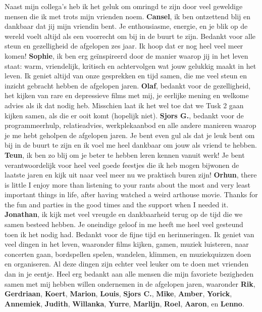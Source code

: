 Naast mijn collega's heb ik het geluk om omringd te zijn door veel geweldige mensen die ik met trots mijn vrienden noem. \newline
\textbf{Cansel}, ik ben ontzettend blij en dankbaar dat jij mijn vriendin bent. Je enthousiasme, energie, en je blik op de wereld voelt altijd als een voorrecht om bij in de buurt te zijn. Bedankt voor alle steun en gezelligheid de afgelopen zes jaar. Ik hoop dat er nog heel veel meer komen! \newline 
\textbf{Sophie}, ik ben erg ge\"{i}nspireerd door de manier waarop jij in het leven staat: warm, vriendelijk, kritisch en achtervolgen wat jouw gelukkig maakt in het leven. Ik geniet altijd van onze gesprekken en tijd samen, die me veel steun en inzicht gebracht hebben de afgelopen jaren. \newline 
\textbf{Olaf}, bedankt voor de gezelligheid, het kijken van rare en depressieve films met mij, je eerlijke mening en welkome advies als ik dat nodig heb. Misschien laat ik het wel toe dat we Tusk 2 gaan kijken samen, als die er ooit komt (hopelijk niet). \newline
\textbf{Sjors G.}, bedankt voor de programmeerhulp, relatieadvies, werkplekaanbod en alle andere manieren waarop je me hebt geholpen de afgelopen jaren. Je bent even gul als dat je leuk bent om bij in de buurt te zijn en ik voel me heel dankbaar om jouw als vriend te hebben. \newline 
\textbf{Teun}, ik ben zo blij om je beter te hebben leren kennen vanuit werk! Je bent verantwoordelijk voor heel veel goede feestjes die ik heb mogen bijwonen de laatste jaren en kijk uit naar veel meer nu we praktisch buren zijn! \newline
\textbf{Orhun}, there is little I enjoy more than listening to your rants about the most and very least important things in life, after having watched a weird arthouse movie. Thanks for the fun and parties in the good times and the support when I needed it. \newline 
\textbf{Jonathan}, ik kijk met veel vreugde en dankbaarheid terug op de tijd die we samen besteed hebben. Je oneindige geloof in me heeft me heel veel gesteund toen ik het nodig had. Bedankt voor de fijne tijd en herinneringen. \newline 
Ik geniet van veel dingen in het leven, waaronder films kijken, gamen, muziek luisteren, naar concerten gaan, bordspellen spelen, wandelen, klimmen, en muziekquizzen doen en organiseren. Al deze dingen zijn echter veel leuker om te doen met vrienden dan in je eentje. Heel erg bedankt aan alle mensen die mijn favoriete bezigheden samen met mij hebben willen ondernemen in de afgelopen jaren, waaronder \textbf{Rik}, \textbf{Gerdriaan}, \textbf{Koert}, \textbf{Marion}, \textbf{Louis}, \textbf{Sjors C.}, \textbf{Mike}, \textbf{Amber}, \textbf{Yorick}, \textbf{Annemiek}, \textbf{Judith}, \textbf{Willanka}, \textbf{Yurre}, \textbf{Marlijn}, \textbf{Roel}, \textbf{Aaron}, en \textbf{Lenno}. \newline
